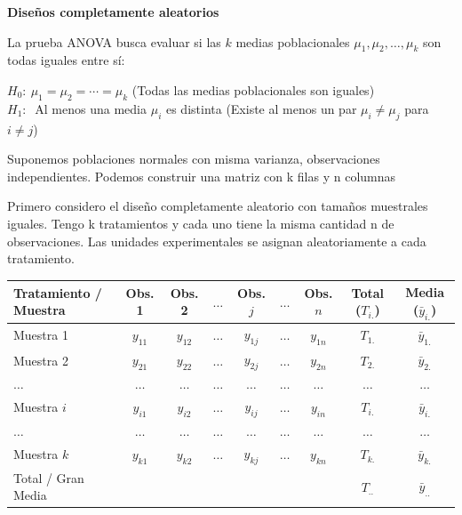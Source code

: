 \documentclass[10pt,a4paper]{article}
\begin{document}
\shorthandoff{<>}

\begin{center}
{\large\bfseries Diseños completamente aleatorios}
\end{center}
\vspace{-2pt}

La prueba ANOVA busca evaluar si las $k$ medias poblacionales $\mu_1,\mu_2,\ldots,\mu_k$ son todas iguales entre sí:

\begin{center}
$H_0: \ \mu_1=\mu_2=\cdots=\mu_k$ \hspace{1cm} (Todas las medias poblacionales son iguales)\\
$H_1: \ $ Al menos una media $\mu_i$ es distinta \hspace{0.5cm} (Existe al menos un par $\mu_i \neq \mu_j$ para $i\neq j$)
\end{center}

Suponemos poblaciones normales con misma varianza, observaciones independientes. Podemos construir una matriz con k filas y n columnas

Primero considero el diseño completamente aleatorio con tamaños muestrales iguales. Tengo k tratamientos y cada uno tiene la misma cantidad n de observaciones. Las unidades experimentales se asignan aleatoriamente a cada tratamiento.

\begin{center}
\vspace{-2pt}
{\small
\begin{tabular}{l c c c c c c | c c}
\toprule
Tratamiento / Muestra & Obs. 1 & Obs. 2 & $\ldots$ & Obs. $j$ & $\ldots$ & Obs. $n$ & Total ($T_{i.}$) & Media ($\bar{y}_{i.}$) \\
\midrule
Muestra 1 & $y_{11}$ & $y_{12}$ & $\ldots$ & $y_{1j}$ & $\ldots$ & $y_{1n}$ & $T_{1.}$ & $\bar{y}_{1.}$ \\
Muestra 2 & $y_{21}$ & $y_{22}$ & $\ldots$ & $y_{2j}$ & $\ldots$ & $y_{2n}$ & $T_{2.}$ & $\bar{y}_{2.}$ \\
$\ldots$ & $\ldots$ & $\ldots$ & $\ldots$ & $\ldots$ & $\ldots$ & $\ldots$ & $\ldots$ & $\ldots$ \\
Muestra $i$ & $y_{i1}$ & $y_{i2}$ & $\ldots$ & $y_{ij}$ & $\ldots$ & $y_{in}$ & $T_{i.}$ & $\bar{y}_{i.}$ \\
$\ldots$ & $\ldots$ & $\ldots$ & $\ldots$ & $\ldots$ & $\ldots$ & $\ldots$ & $\ldots$ & $\ldots$ \\
Muestra $k$ & $y_{k1}$ & $y_{k2}$ & $\ldots$ & $y_{kj}$ & $\ldots$ & $y_{kn}$ & $T_{k.}$ & $\bar{y}_{k.}$ \\
\midrule
Total / Gran Media & & & & & & & $T_{..}$ & $\bar{y}_{..}$ \\
\bottomrule
\end{tabular}
}
\end{center}
\end{document}
